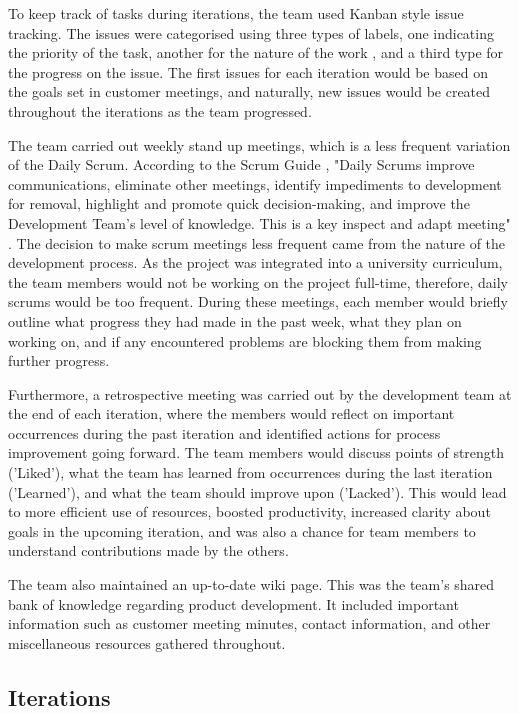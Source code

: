 \documentclass{l3proj}
\begin{document}
To keep track of tasks during iterations, the team used Kanban style issue tracking. The issues were categorised using three types of labels, one indicating the priority of the task, another for the nature of the work , and a third type for the progress on the issue. The first issues for each iteration would be based on the goals set in customer meetings, and naturally, new issues would be created throughout the iterations as the team progressed.

The team carried out weekly stand up meetings, which is a less frequent variation of the Daily Scrum. According to the Scrum Guide \cite{SCRUMGUIDE}, "Daily Scrums improve communications, eliminate other meetings, identify impediments to development for removal, highlight and promote quick decision-making, and improve the Development Team's level of knowledge. This is a key inspect and adapt meeting" \cite{DAILYSCRUM}. The decision to make scrum meetings less frequent came from the nature of the development process. As the project was integrated into a university curriculum, the team members would not be working on the project full-time, therefore, daily scrums would be too frequent. During these meetings, each member would briefly outline what progress they had made in the past week, what they plan on working on, and if any encountered problems are blocking them from making further progress.

Furthermore, a retrospective meeting was carried out by the development team at the end of each iteration, where the members would reflect on important occurrences during the past iteration and identified actions for process improvement going forward. The team members would discuss points of strength ('Liked'), what the team has learned from occurrences during the last iteration ('Learned'), and what the team should improve upon ('Lacked'). This would lead to more efficient use of resources, boosted productivity, increased clarity about goals in the upcoming iteration, and was also a chance for team members to understand contributions made by the others.

The team also maintained an up-to-date wiki page. This was the team's shared bank of knowledge regarding product development. It included important information such as customer meeting minutes, contact information, and other miscellaneous resources gathered throughout.


\subsection{Iterations}
\label{subsec:iterations}
\end{document}
